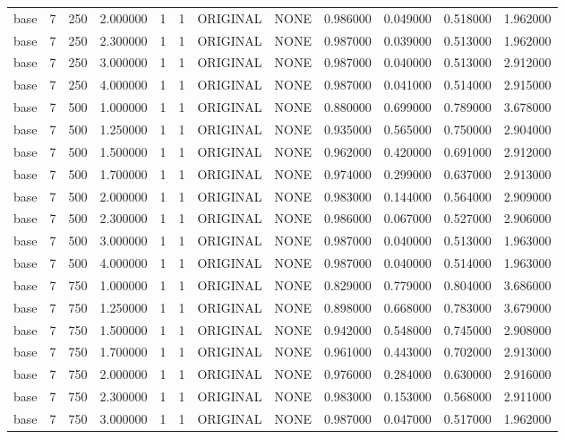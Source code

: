 \begin{tabular}{lrrrllllrrrr}
base & 7 & 250 & 2.000000 & 1 & 1 & ORIGINAL & NONE & 0.986000 & 0.049000 & 0.518000 & 1.962000 \\
base & 7 & 250 & 2.300000 & 1 & 1 & ORIGINAL & NONE & 0.987000 & 0.039000 & 0.513000 & 1.962000 \\
base & 7 & 250 & 3.000000 & 1 & 1 & ORIGINAL & NONE & 0.987000 & 0.040000 & 0.513000 & 2.912000 \\
base & 7 & 250 & 4.000000 & 1 & 1 & ORIGINAL & NONE & 0.987000 & 0.041000 & 0.514000 & 2.915000 \\
base & 7 & 500 & 1.000000 & 1 & 1 & ORIGINAL & NONE & 0.880000 & 0.699000 & 0.789000 & 3.678000 \\
base & 7 & 500 & 1.250000 & 1 & 1 & ORIGINAL & NONE & 0.935000 & 0.565000 & 0.750000 & 2.904000 \\
base & 7 & 500 & 1.500000 & 1 & 1 & ORIGINAL & NONE & 0.962000 & 0.420000 & 0.691000 & 2.912000 \\
base & 7 & 500 & 1.700000 & 1 & 1 & ORIGINAL & NONE & 0.974000 & 0.299000 & 0.637000 & 2.913000 \\
base & 7 & 500 & 2.000000 & 1 & 1 & ORIGINAL & NONE & 0.983000 & 0.144000 & 0.564000 & 2.909000 \\
base & 7 & 500 & 2.300000 & 1 & 1 & ORIGINAL & NONE & 0.986000 & 0.067000 & 0.527000 & 2.906000 \\
base & 7 & 500 & 3.000000 & 1 & 1 & ORIGINAL & NONE & 0.987000 & 0.040000 & 0.513000 & 1.963000 \\
base & 7 & 500 & 4.000000 & 1 & 1 & ORIGINAL & NONE & 0.987000 & 0.040000 & 0.514000 & 1.963000 \\
base & 7 & 750 & 1.000000 & 1 & 1 & ORIGINAL & NONE & 0.829000 & 0.779000 & 0.804000 & 3.686000 \\
base & 7 & 750 & 1.250000 & 1 & 1 & ORIGINAL & NONE & 0.898000 & 0.668000 & 0.783000 & 3.679000 \\
base & 7 & 750 & 1.500000 & 1 & 1 & ORIGINAL & NONE & 0.942000 & 0.548000 & 0.745000 & 2.908000 \\
base & 7 & 750 & 1.700000 & 1 & 1 & ORIGINAL & NONE & 0.961000 & 0.443000 & 0.702000 & 2.913000 \\
base & 7 & 750 & 2.000000 & 1 & 1 & ORIGINAL & NONE & 0.976000 & 0.284000 & 0.630000 & 2.916000 \\
base & 7 & 750 & 2.300000 & 1 & 1 & ORIGINAL & NONE & 0.983000 & 0.153000 & 0.568000 & 2.911000 \\
base & 7 & 750 & 3.000000 & 1 & 1 & ORIGINAL & NONE & 0.987000 & 0.047000 & 0.517000 & 1.962000 \\

\end{tabular}
